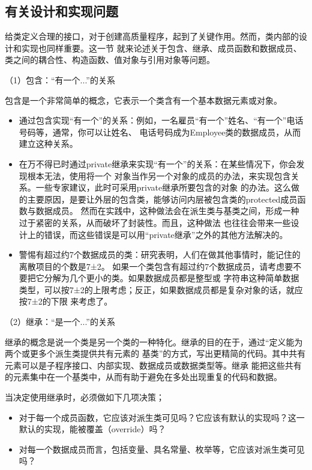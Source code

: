 \documentclass{article}
\begin{document}
\subsection{有关设计和实现问题}
给类定义合理的接口，对于创建高质量程序，起到了关键作用。然而，类内部的设计和实现也同样重要。这一节
就来论述关于包含、继承、成员函数和数据成员、类之间的耦合性、构造函数、值对象与引用对象等问题。
\par
（1）包含：“有一个...”的关系
\par
包含是一个非常简单的概念，它表示一个类含有一个基本数据元素或对象。
\begin{itemize}
    \item 通过包含实现“有一个”的关系：例如，一名雇员“有一个”姓名、“有一个”电话号码等，通常，你可以让姓名、
    电话号码成为Employee类的数据成员，从而建立这种关系。
    \item 在万不得已时通过private继承来实现“有一个”的关系：在某些情况下，你会发现根本无法，使用将一个
    对象当作另一个对象的成员的办法，来实现包含关系。一些专家建议，此时可采用private继承所要包含的对象
    的办法。这么做的主要原因，是要让外层的包含类，能够访问内层被包含类的protected成员函数与数据成员。
    然而在实践中，这种做法会在派生类与基类之间，形成一种过于紧密的关系，从而破坏了封装性。而且，这种做法
    也往往会带来一些设计上的错误，而这些错误是可以用“private继承”之外的其他方法解决的。
    \item 警惕有超过约7个数据成员的类：研究表明，人们在做其他事情时，能记住的离散项目的个数是7±2。
    如果一个类包含有超过约7个数据成员，请考虑要不要把它分解为几个更小的类。如果数据成员都是整型或
    字符串这种简单数据类型，可以按7±2的上限考虑；反正，如果数据成员都是复杂对象的话，就应按7±2的下限
    来考虑了。
\end{itemize}
\par
（2）继承：“是一个...”的关系
\par
继承的概念是说一个类是另一个类的一种特化。继承的目的在于，通过“定义能为两个或更多个派生类提供共有元素的
基类”的方式，写出更精简的代码。其中共有元素可以是子程序接口、内部实现、数据成员或数据类型等。继承
能把这些共有的元素集中在一个基类中，从而有助于避免在多处出现重复的代码和数据。
\par
当决定使用继承时，必须做如下几项决策；
\begin{itemize}
    \item 对于每一个成员函数，它应该对派生类可见吗？它应该有默认的实现吗？这一默认的实现，能被覆盖（override）吗？
    \item 对每一个数据成员而言，包括变量、具名常量、枚举等，它应该对派生类可见吗？
\end{itemize}
\end{document}
